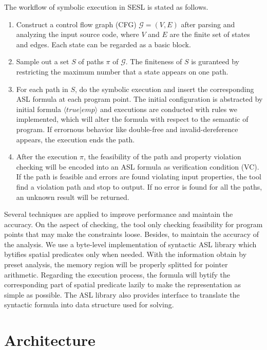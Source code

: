 \documentclass[runningheads]{llncs}
\begin{document}
The workflow of symbolic execution in \textsc{SESL} is stated as follows. 
\begin{enumerate}
\item Construct a control flow graph (CFG) $\mathcal{G} = (V, E)$ after parsing and analyzing the input source code, where $V$ and $E$ are the finite set of states and edges. Each state can be regarded as a basic block.
\item Sample out a set $S$ of paths $\pi$ of $\mathcal{G}$. The finiteness of $S$ is guranteed by restricting the maximum number that a state appears on one path. 
\item For each path in $S$,  do the symbolic execution and insert the corresponding ASL formula at each program point. The initial configuration is abstracted by initial formula $\langle true| emp\rangle$ and executions are conducted with rules we implemented, which will alter the formula with respect to the semantic of program. If errornous behavior like double-free and invalid-dereference appears, the execution ends the path.

\item After the execution $\pi$, the feasibility of the path and property violation checking will be encoded into an ASL formula as verification condition (VC). If the path is feasible and errors are found violating input properties, the tool find a violation path and stop to output. If no error is found for all the paths, an unknown result will be returned.
\end{enumerate}

Several techniques are applied to improve performance and maintain the accuracy. On the aspect of checking, the tool only checking feasibility for program points that may make the constraints loose. Besides, to maintain the accuracy of the analysis. We use a byte-level implementation of syntactic ASL library which bytifies spatial predicates only when needed. With the information obtain by preset analysis, the memory region will be properly splitted for pointer arithmetic. Regarding the execution process, the formula will bytify the corresponding part of spatial predicate lazily to make the representation as simple as possible. The ASL library also provides interface to translate the syntactic formula into data structure used for solving.

\section{Architecture}
\end{document}
